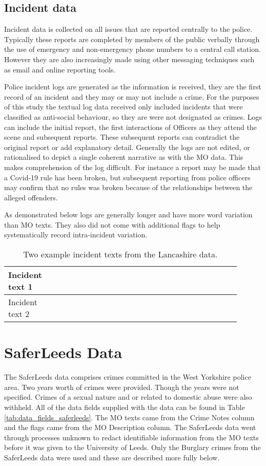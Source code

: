 \subsection{Incident data} Incident data is collected on all issues that are reported centrally to the police. Typically these reports are completed by members of the public verbally through the use of emergency and non-emergency phone numbers to a central call station. However they are also increasingly made using other messaging techniques such as email and online reporting tools. 

Police incident logs are generated as the information is received, they are the first record of an incident and they may or may not include a crime. For the purposes of this study the textual log data received only included incidents that were classified as anti-social behaviour, so they are were not designated as crimes. Logs can include the initial report, the first interactions of Officers as they attend the scene and subsequent reports. These subsequent reports can contradict the original report or add explanatory detail. Generally the logs are not edited, or rationalised to depict a single coherent narrative as with the MO data. This makes comprehension of the log difficult. For instance a report may be made that a Covid-19 rule has been broken, but subsequent reporting from police officers may confirm that no rules was broken because of the relationships between the alleged offenders.

As demonstrated below logs are generally longer and have more word variation than MO texts. They also did not come with additional flags to help systematically record intra-incident variation.


\begin{table}[]
\centering
\begin{tabular}{p{0.1\linewidth}p{0.8\linewidth}}

\toprule
Incident text 1 &                                                               \\ \midrule
Incident text 2 &\\ \bottomrule
\end{tabular}
\caption{\label{tab:example_incident} Two example incident texts from the Lancashire data.}
\end{table}




\section{SaferLeeds Data} The SaferLeeds data comprises crimes committed in the West Yorkshire police area. Two years worth of crimes were provided. Though the years were not specified. Crimes of a sexual nature and or related to domestic abuse were also withheld. All of the data fields supplied with the data can be found in Table \ref{tab:data_fields_saferleeds}. The MO texts came from the Crime Notes column and the flags came from the MO Description column. The SaferLeeds data went through processes unknown to redact identifiable information from the MO texts before it was given to the University of Leeds. Only the Burglary crimes from the SaferLeeds data were used and these are described more fully below.

